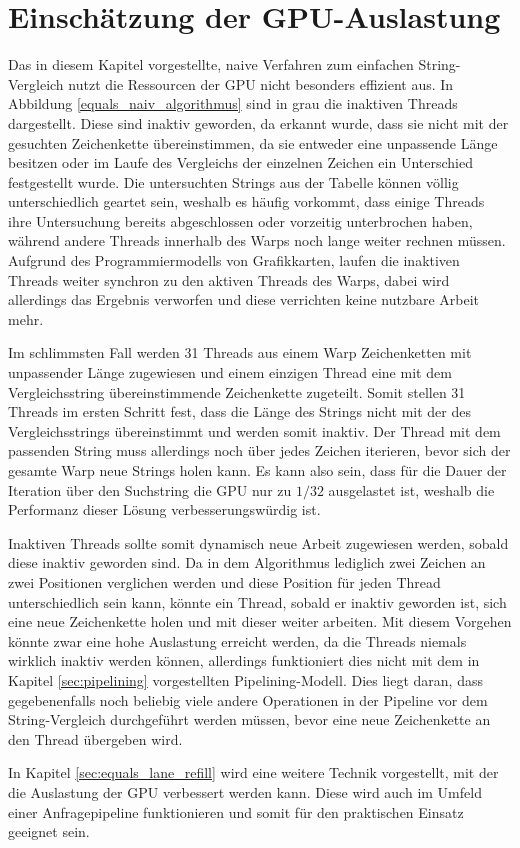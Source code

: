 \section{Einschätzung der GPU-Auslastung}

Das in diesem Kapitel vorgestellte, naive Verfahren zum einfachen String-Vergleich nutzt die Ressourcen der GPU nicht besonders effizient aus.
In Abbildung \ref{equals_naiv_algorithmus} sind in grau die inaktiven Threads dargestellt.
Diese sind inaktiv geworden, da erkannt wurde, dass sie nicht mit der gesuchten Zeichenkette übereinstimmen, da sie entweder eine unpassende Länge besitzen oder im Laufe des Vergleichs der einzelnen Zeichen ein Unterschied festgestellt wurde.
Die untersuchten Strings aus der Tabelle können völlig unterschiedlich geartet sein, weshalb es häufig vorkommt, dass einige Threads ihre Untersuchung bereits abgeschlossen oder vorzeitig unterbrochen haben, während andere Threads innerhalb des Warps noch lange weiter rechnen müssen.
Aufgrund des Programmiermodells von Grafikkarten, laufen die inaktiven Threads weiter synchron zu den aktiven Threads des Warps, dabei wird allerdings das Ergebnis verworfen und diese verrichten keine nutzbare Arbeit mehr.

Im schlimmsten Fall werden 31 Threads aus einem Warp Zeichenketten mit unpassender Länge zugewiesen und einem einzigen Thread eine mit dem Vergleichsstring übereinstimmende Zeichenkette zugeteilt.
Somit stellen 31 Threads im ersten Schritt fest, dass die Länge des Strings nicht mit der des Vergleichsstrings übereinstimmt und werden somit inaktiv.
Der Thread mit dem passenden String muss allerdings noch über jedes Zeichen iterieren, bevor sich der gesamte Warp neue Strings holen kann.
Es kann also sein, dass für die Dauer der Iteration über den Suchstring die GPU nur zu $1/32$ ausgelastet ist, weshalb die Performanz dieser Lösung verbesserungswürdig ist.

Inaktiven Threads sollte somit dynamisch neue Arbeit zugewiesen werden, sobald diese inaktiv geworden sind.
Da in dem Algorithmus lediglich zwei Zeichen an zwei Positionen verglichen werden und diese Position für jeden Thread unterschiedlich sein kann, könnte ein Thread, sobald er inaktiv geworden ist, sich eine neue Zeichenkette holen und mit dieser weiter arbeiten.
Mit diesem Vorgehen könnte zwar eine hohe Auslastung erreicht werden, da die Threads niemals wirklich inaktiv werden können, allerdings funktioniert dies nicht mit dem in Kapitel \ref{sec:pipelining} vorgestellten Pipelining-Modell.
Dies liegt daran, dass gegebenenfalls noch beliebig viele andere Operationen in der Pipeline vor dem String-Vergleich durchgeführt werden müssen, bevor eine neue Zeichenkette an den Thread übergeben wird.

In Kapitel \ref{sec:equals_lane_refill} wird eine weitere Technik vorgestellt, mit der die Auslastung der GPU verbessert werden kann.
Diese wird auch im Umfeld einer Anfragepipeline funktionieren und somit für den praktischen Einsatz geeignet sein.